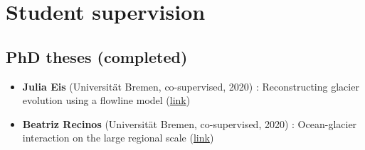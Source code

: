 \section*{Student supervision}
\label{\detokenize{ch08/cv:student-supervision}}

\subsection*{PhD theses (completed)}
\label{\detokenize{ch08/cv:phd-theses-completed}}\begin{itemize}[nosep]
\item {} 
\textbf{Julia Eis} (Universität Bremen, co-supervised, 2020)
: Reconstructing glacier evolution using a flowline model (\href{https://media.suub.uni-bremen.de/handle/elib/4635}{link})

\item {} 
\textbf{Beatriz Recinos} (Universität Bremen, co-supervised, 2020)
: Ocean-glacier interaction on the large regional scale (\href{https://media.suub.uni-bremen.de/handle/elib/4637}{link})

\end{itemize}


